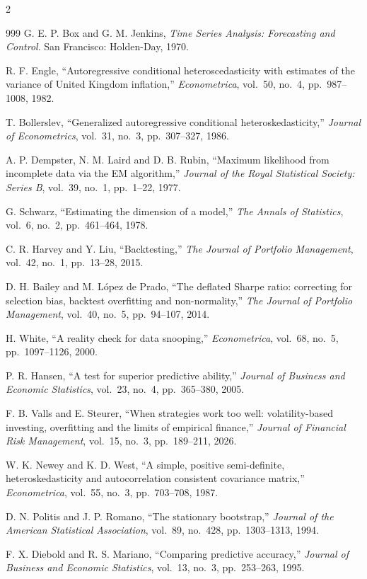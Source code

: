 \begin{footnotesize}
\begin{multicols}{2}
\begin{thebibliography}{999}
 G. E. P. Box and G. M. Jenkins, \emph{Time Series Analysis: Forecasting
and Control}. San Francisco: Holden-Day, 1970.

 R. F. Engle, ``Autoregressive conditional heteroscedasticity with estimates of
the variance of United Kingdom inflation,'' \emph{Econometrica}, vol.~50, no.~4, pp.~987--1008,
1982.

 T. Bollerslev, ``Generalized autoregressive conditional
heteroskedasticity,'' \emph{Journal of Econometrics}, vol.~31, no.~3, pp.~307--327, 1986.

 A. P. Dempster, N. M. Laird and D. B. Rubin, ``Maximum likelihood from
incomplete data via the EM algorithm,'' \emph{Journal of the Royal Statistical Society: Series B},
vol.~39, no.~1, pp.~1--22, 1977.

 G. Schwarz, ``Estimating the dimension of a model,'' \emph{The Annals of
Statistics}, vol.~6, no.~2, pp.~461--464, 1978.

 C. R. Harvey and Y. Liu, ``Backtesting,'' \emph{The Journal of Portfolio
Management}, vol.~42, no.~1, pp.~13--28, 2015.

 D. H. Bailey and M. L\'opez de Prado, ``The deflated Sharpe ratio:
correcting for selection bias, backtest overfitting and non-normality,'' \emph{The Journal of
Portfolio Management}, vol.~40, no.~5, pp.~94--107, 2014.

 H. White, ``A reality check for data snooping,'' \emph{Econometrica}, vol.~68,
no.~5, pp.~1097--1126, 2000.

 P. R. Hansen, ``A test for superior predictive ability,'' \emph{Journal of
Business and Economic Statistics}, vol.~23, no.~4, pp.~365--380, 2005.

 F. B. Valls and E. Steurer, ``When strategies work too well: volatility-based
investing, overfitting and the limits of empirical finance,'' \emph{Journal of Financial Risk
Management}, vol.~15, no.~3, pp.~189--211, 2026.

 W. K. Newey and K. D. West, ``A simple, positive semi-definite,
heteroskedasticity and autocorrelation consistent covariance matrix,'' \emph{Econometrica},
vol.~55, no.~3, pp.~703--708, 1987.

 D. N. Politis and J. P. Romano, ``The stationary bootstrap,'' \emph{Journal
of the American Statistical Association}, vol.~89, no.~428, pp.~1303--1313, 1994.

 F. X. Diebold and R. S. Mariano, ``Comparing predictive accuracy,''
\emph{Journal of Business and Economic Statistics}, vol.~13, no.~3, pp.~253--263, 1995.

\end{thebibliography}
\end{multicols}
\end{footnotesize}
